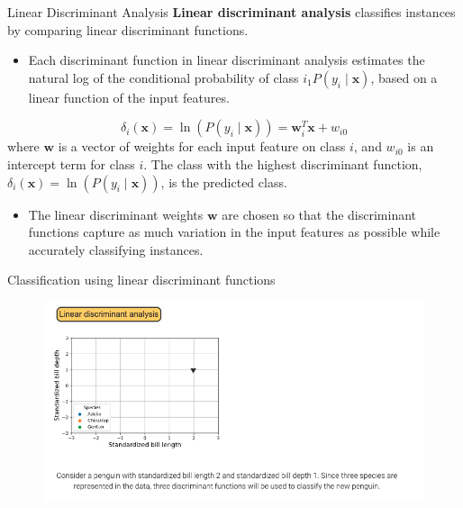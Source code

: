 \documentclass[10pt,dvipsnames]{beamer}
\begin{document}
\begin{frame}{Linear Discriminant Analysis}
	\textbf{Linear discriminant analysis} classifies instances by comparing linear discriminant functions.
	\begin{itemize}
		\item Each discriminant function in linear discriminant analysis estimates the natural log of the conditional probability of class \(i_{1} P\left(y_{i} \mid \mathbf{x}\right)\), based on a linear function of the input features.
	\end{itemize}
	$$
		\delta_{i}(\mathbf{x})=\ln \left(P\left(y_{i} \mid \mathbf{x}\right)\right)=\mathbf{w}_{i}^{T} \mathbf{x}+w_{i 0}
	$$
	where \(\mathbf{w}\) is a vector of weights for each input feature on class \(i\), and \(w_{i 0}\) is an intercept term for class \(i\).
	The class with the highest discriminant function, \(\delta_{i}(\mathbf{x})=\ln \left(P\left(y_{i} \mid \mathbf{x}\right)\right)\), is the predicted class.
	\begin{itemize}
		\item 	The linear discriminant weights \(\mathbf{w}\) are chosen so that the discriminant functions capture as much variation in the input features as possible while accurately classifying instances.
	\end{itemize}
\end{frame}

\begin{frame}{Classification using linear discriminant functions}
	\begin{figure}[ht]
		\centering
		\includegraphics[width=\textwidth]{imgs/df_1.png}
	\end{figure}
\end{frame}
\end{document}
